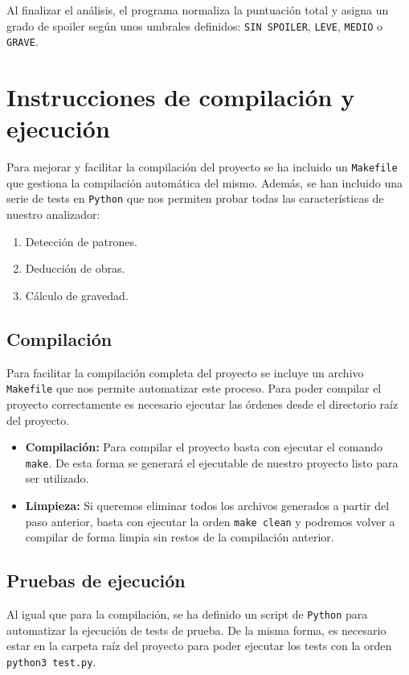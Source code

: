 \documentclass{article}
\begin{document}
Al finalizar el análisis, el programa normaliza la puntuación total y asigna un grado de spoiler según unos umbrales definidos: \texttt{SIN SPOILER}, \texttt{LEVE}, \texttt{MEDIO} o \texttt{GRAVE}.

\newpage




\section{Instrucciones de compilación y ejecución}

Para mejorar y facilitar la compilación del proyecto se ha incluido un \texttt{Makefile} que gestiona la compilación automática del mismo. Además, se han incluido una serie de tests en \texttt{Python} que nos permiten probar todas las características de nuestro analizador:
\begin{enumerate}
    \item Detección de patrones.
    \item Deducción de obras.
    \item Cálculo de gravedad.
\end{enumerate}

\subsection{Compilación}
Para facilitar la compilación completa del proyecto se incluye un archivo \texttt{Makefile} que nos permite automatizar este proceso. Para poder compilar el proyecto correctamente es necesario ejecutar las órdenes desde el directorio raíz del proyecto.

\begin{itemize}
    \item \textbf{Compilación:} Para compilar el proyecto basta con ejecutar el comando \texttt{make}. De esta forma se generará el ejecutable de nuestro proyecto listo para ser utilizado.
    \item \textbf{Limpieza:} Si queremos eliminar todos los archivos generados a partir del paso anterior, basta con ejecutar la orden \texttt{make clean} y podremos volver a compilar de forma limpia sin restos de la compilación anterior.
\end{itemize}

\subsection{Pruebas de ejecución}
Al igual que para la compilación, se ha definido un script de \texttt{Python} para automatizar la ejecución de tests de prueba. De la misma forma, es necesario estar en la carpeta raíz del proyecto para poder ejecutar los tests con la orden \texttt{python3 test.py}.
\end{document}

